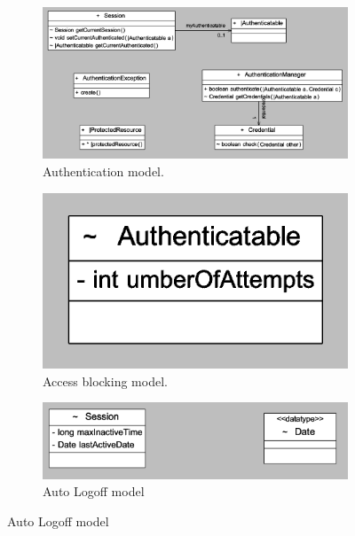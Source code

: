 \begin{figure}
	\centering
    \begin{subfigure}[b]{0.3\linewidth}
    	\includegraphics[width=\linewidth]{authenticationModel.PNG}
        \caption{Authentication model.}
        \label{authentication model}
    \end{subfigure}
    \begin{subfigure}[b]{0.3\linewidth}
    	\includegraphics[width=\linewidth]{accessblockingModel.PNG}
        \caption{Access blocking model.}
        \label{access blocking}
    \end{subfigure}
    \begin{subfigure}[b]{0.3\linewidth}
    	\includegraphics[width=\linewidth]{autologoffModel.PNG}
        \caption{Auto Logoff model}
        \label{auto logoff}
    \end{subfigure}

\end{figure}
